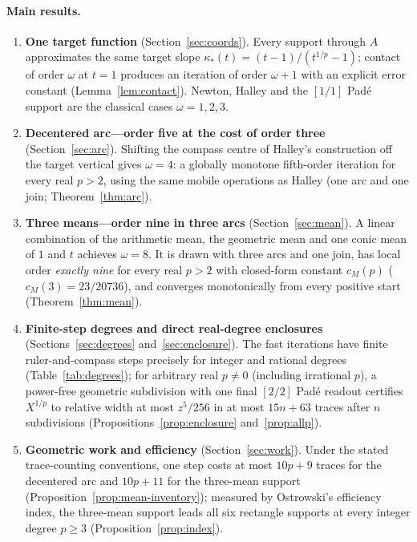 \documentclass[10pt,a4paper]{article}
\theoremstyle{plain}
\theoremstyle{remark}
\numberwithin{equation}{section}
\begin{document}
\paragraph{Main results.}
\begin{enumerate}[label=\arabic*.]
\item \textbf{One target function} (Section~\ref{sec:coords}). Every support through $A$ approximates the
  same target slope $\kappa_*(t)=(t-1)/(t^{1/p}-1)$; contact of order $\omega$ at $t=1$ produces an
  iteration of order $\omega+1$ with an explicit error constant (Lemma~\ref{lem:contact}). Newton, Halley
  and the $[1/1]$ Pad\'e support are the classical cases $\omega=1,2,3$.
\item \textbf{Decentered arc---order five at the cost of order three} (Section~\ref{sec:arc}). Shifting the
  compass centre of Halley's construction off the target vertical gives $\omega=4$: a globally monotone
  fifth-order iteration for every real $p>2$, using the same mobile operations as Halley (one arc and one
  join; Theorem~\ref{thm:arc}).
\item \textbf{Three means---order nine in three arcs} (Section~\ref{sec:mean}). A linear combination of the
  arithmetic mean, the geometric mean and one conic mean of $1$ and $t$ achieves $\omega=8$. It is drawn
  with three arcs and one join, has local order \emph{exactly nine} for every real $p>2$ with closed-form
  constant $c_M(p)$ ($c_M(3)=23/20736$), and converges monotonically from every positive start
  (Theorem~\ref{thm:mean}).
\item \textbf{Finite-step degrees and direct real-degree enclosures} (Sections~\ref{sec:degrees}
  and~\ref{sec:enclosure}). The fast iterations have finite ruler-and-compass steps precisely for integer
  and rational degrees (Table~\ref{tab:degrees}); for arbitrary real $p\neq0$ (including irrational $p$), a
  power-free geometric subdivision with one final $[2/2]$ Pad\'e readout certifies $X^{1/p}$ to relative
  width at most $z^{5}/256$ in at most $15n+63$ traces after $n$ subdivisions
  (Propositions~\ref{prop:enclosure} and~\ref{prop:allp}).
\item \textbf{Geometric work and efficiency} (Section~\ref{sec:work}). Under the stated trace-counting
  conventions, one step costs at most $10p+9$ traces for the decentered arc and $10p+11$ for the three-mean
  support (Proposition~\ref{prop:mean-inventory}); measured by Ostrowski's efficiency index, the three-mean
  support leads all six rectangle supports at every integer degree $p\ge3$ (Proposition~\ref{prop:index}).
\end{enumerate}
\end{document}

